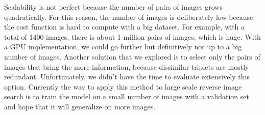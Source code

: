 Scalability is not perfect because the number of pairs of images grows quadratically. For this reason, the number of images is deliberately low because the cost function is hard to compute with a big dataset. For example, with a total of 1400 images, there is about 1 million pairs of images, which is huge. With a GPU implementation, we could go further but definitively not up to a big number of images. Another solution that we explored is to select only the pairs of images that bring the more information, because dissimilar triplets are mostly redundant. Unfortunately, we didn't have the time to evaluate extensively this option. Currently the way to apply this method to large scale reverse image search is to train the model on a small number of images with a validation set and hope that it will generalize on more images.
